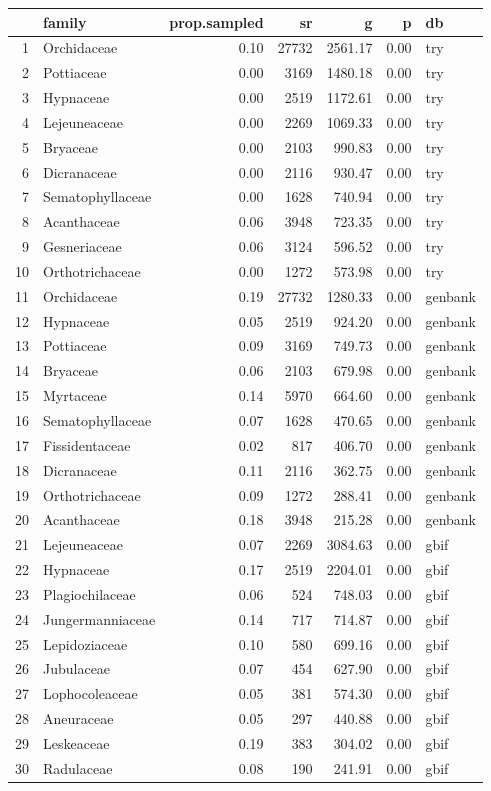 \begin{tabular}{rlrrrrl}
  \toprule
 & family & prop.sampled & sr & g & p & db \\ 
  \midrule
1 & Orchidaceae & 0.10 & 27732 & 2561.17 & 0.00 & try \\ 
  2 & Pottiaceae & 0.00 & 3169 & 1480.18 & 0.00 & try \\ 
  3 & Hypnaceae & 0.00 & 2519 & 1172.61 & 0.00 & try \\ 
  4 & Lejeuneaceae & 0.00 & 2269 & 1069.33 & 0.00 & try \\ 
  5 & Bryaceae & 0.00 & 2103 & 990.83 & 0.00 & try \\ 
  6 & Dicranaceae & 0.00 & 2116 & 930.47 & 0.00 & try \\ 
  7 & Sematophyllaceae & 0.00 & 1628 & 740.94 & 0.00 & try \\ 
  8 & Acanthaceae & 0.06 & 3948 & 723.35 & 0.00 & try \\ 
  9 & Gesneriaceae & 0.06 & 3124 & 596.52 & 0.00 & try \\ 
  10 & Orthotrichaceae & 0.00 & 1272 & 573.98 & 0.00 & try \\ 
  11 & Orchidaceae & 0.19 & 27732 & 1280.33 & 0.00 & genbank \\ 
  12 & Hypnaceae & 0.05 & 2519 & 924.20 & 0.00 & genbank \\ 
  13 & Pottiaceae & 0.09 & 3169 & 749.73 & 0.00 & genbank \\ 
  14 & Bryaceae & 0.06 & 2103 & 679.98 & 0.00 & genbank \\ 
  15 & Myrtaceae & 0.14 & 5970 & 664.60 & 0.00 & genbank \\ 
  16 & Sematophyllaceae & 0.07 & 1628 & 470.65 & 0.00 & genbank \\ 
  17 & Fissidentaceae & 0.02 & 817 & 406.70 & 0.00 & genbank \\ 
  18 & Dicranaceae & 0.11 & 2116 & 362.75 & 0.00 & genbank \\ 
  19 & Orthotrichaceae & 0.09 & 1272 & 288.41 & 0.00 & genbank \\ 
  20 & Acanthaceae & 0.18 & 3948 & 215.28 & 0.00 & genbank \\ 
  21 & Lejeuneaceae & 0.07 & 2269 & 3084.63 & 0.00 & gbif \\ 
  22 & Hypnaceae & 0.17 & 2519 & 2204.01 & 0.00 & gbif \\ 
  23 & Plagiochilaceae & 0.06 & 524 & 748.03 & 0.00 & gbif \\ 
  24 & Jungermanniaceae & 0.14 & 717 & 714.87 & 0.00 & gbif \\ 
  25 & Lepidoziaceae & 0.10 & 580 & 699.16 & 0.00 & gbif \\ 
  26 & Jubulaceae & 0.07 & 454 & 627.90 & 0.00 & gbif \\ 
  27 & Lophocoleaceae & 0.05 & 381 & 574.30 & 0.00 & gbif \\ 
  28 & Aneuraceae & 0.05 & 297 & 440.88 & 0.00 & gbif \\ 
  29 & Leskeaceae & 0.19 & 383 & 304.02 & 0.00 & gbif \\ 
  30 & Radulaceae & 0.08 & 190 & 241.91 & 0.00 & gbif \\ 
   \bottomrule
\end{tabular}
